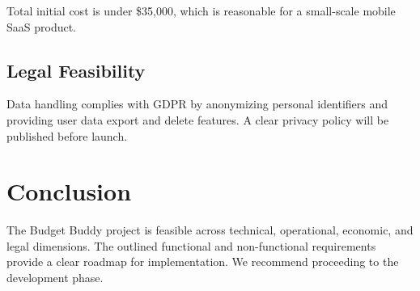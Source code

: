 \documentclass[12pt,a4paper]{article}
\begin{document}
\noindent Total initial cost is under \$35,000, which is reasonable for a small-scale
mobile SaaS product.

\subsection{Legal Feasibility}
Data handling complies with GDPR by anonymizing personal identifiers and providing
user data export and delete features. A clear privacy policy will be published before
launch.

\section{Conclusion}
The Budget Buddy project is feasible across technical, operational, economic, and legal
dimensions. The outlined functional and non-functional requirements provide a clear
roadmap for implementation. We recommend proceeding to the development phase.
\end{document}
